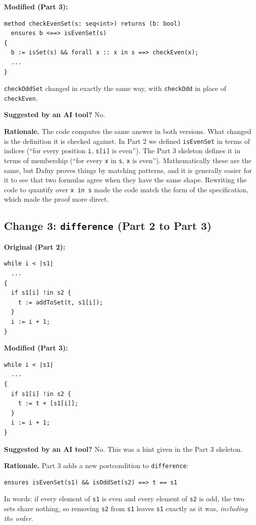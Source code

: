 \documentclass[11pt,a4paper]{article}
\newcommand{\aiflag}[1]{\par\noindent\textbf{Suggested by an AI tool?} #1\par}
\begin{document}
\textbf{Modified (Part 3):}
\begin{lstlisting}
method checkEvenSet(s: seq<int>) returns (b: bool)
  ensures b <==> isEvenSet(s)
{
  b := isSet(s) && forall x :: x in s ==> checkEven(x);
  ...
}
\end{lstlisting}
\texttt{checkOddSet} changed in exactly the same way, with \texttt{checkOdd} in place of \texttt{checkEven}.

\aiflag{No.}

\textbf{Rationale.} The code computes the same answer in both versions. What changed is the definition it is checked against. In Part 2 we defined \texttt{isEvenSet} in terms of indices (``for every position \texttt{i}, \texttt{s[i]} is even''). The Part 3 skeleton defines it in terms of membership (``for every \texttt{x} in \texttt{s}, \texttt{x} is even''). Mathematically these are the same, but Dafny proves things by matching patterns, and it is generally easier for it to see that two formulas agree when they have the same shape. Rewriting the code to quantify over \texttt{x in s} made the code match the form of the specification, which made the proof more direct.

\subsection*{Change 3: \texttt{difference} (Part 2 to Part 3)}

\textbf{Original (Part 2):}
\begin{lstlisting}
while i < |s1|
  ...
{
  if s1[i] !in s2 {
    t := addToSet(t, s1[i]);
  }
  i := i + 1;
}
\end{lstlisting}

\textbf{Modified (Part 3):}
\begin{lstlisting}
while i < |s1|
  ...
{
  if s1[i] !in s2 {
    t := t + [s1[i]];
  }
  i := i + 1;
}
\end{lstlisting}

\aiflag{No. This was a hint given in the Part 3 skeleton.}

\textbf{Rationale.} Part 3 adds a new postcondition to \texttt{difference}:
\begin{lstlisting}
ensures isEvenSet(s1) && isOddSet(s2) ==> t == s1
\end{lstlisting}
In words: if every element of \texttt{s1} is even and every element of \texttt{s2} is odd, the two sets share nothing, so removing \texttt{s2} from \texttt{s1} leaves \texttt{s1} exactly as it was, \emph{including the order}.
\end{document}
